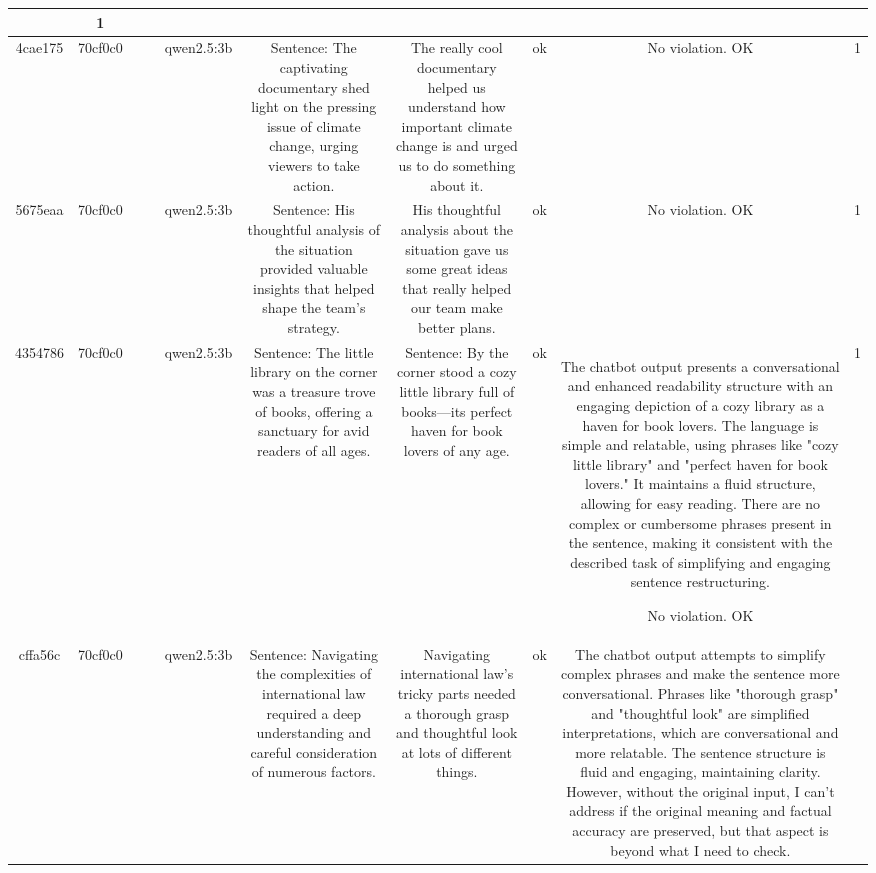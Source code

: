 \begin{table}[h!]
\begin{tabular}{|c|c|c|c|c|c|c|c|c|c|}
{No violation.
OK & 1\\
\hline
4cae175 & 70cf0c0 &  &  & qwen2.5:3b & Sentence: The captivating documentary shed light on the pressing issue of climate change, urging viewers to take action. & The really cool documentary helped us understand how important climate change is and urged us to do something about it. & ok & No violation.
OK & 1\\
\hline
5675eaa & 70cf0c0 &  &  & qwen2.5:3b & Sentence: His thoughtful analysis of the situation provided valuable insights that helped shape the team's strategy. & His thoughtful analysis about the situation gave us some great ideas that really helped our team make better plans. & ok & No violation.
OK & 1\\
\hline
4354786 & 70cf0c0 &  &  & qwen2.5:3b & Sentence: The little library on the corner was a treasure trove of books, offering a sanctuary for avid readers of all ages. & Sentence: By the corner stood a cozy little library full of books—its perfect haven for book lovers of any age. & ok & The chatbot output presents a conversational and enhanced readability structure with an engaging depiction of a cozy library as a haven for book lovers. The language is simple and relatable, using phrases like "cozy little library" and "perfect haven for book lovers." It maintains a fluid structure, allowing for easy reading. There are no complex or cumbersome phrases present in the sentence, making it consistent with the described task of simplifying and engaging sentence restructuring.  

No violation.
OK & 1\\
\hline
cffa56c & 70cf0c0 &  &  & qwen2.5:3b & Sentence: Navigating the complexities of international law required a deep understanding and careful consideration of numerous factors. & Navigating international law's tricky parts needed a thorough grasp and thoughtful look at lots of different things. & ok & The chatbot output attempts to simplify complex phrases and make the sentence more conversational. Phrases like "thorough grasp" and "thoughtful look" are simplified interpretations, which are conversational and more relatable. The sentence structure is fluid and engaging, maintaining clarity. However, without the original input, I can't address if the original meaning and factual accuracy are preserved, but that aspect is beyond what I need to check.

}
\end{tabular}
\end{table}
